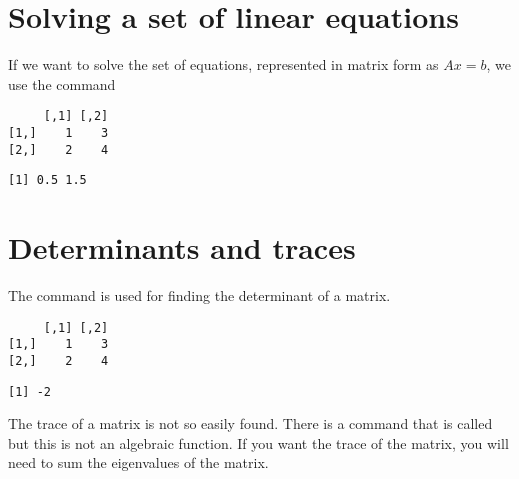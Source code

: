  
\section{Solving a set of linear equations} 
 
If we want to solve the set of equations, represented in matrix form as $Ax=b$, we use the  command 
\begin{knitrout}
\color{fgcolor}\begin{kframe}
\begin{alltt}
\hlstd{> }
\end{alltt}
\begin{verbatim}
     [,1] [,2]
[1,]    1    3
[2,]    2    4
\end{verbatim}
\begin{alltt}
\hlstd{> }\hlkwb{=}\hlstd{(}\hlstd{,}\hlstd{)}
\hlstd{> }
\end{alltt}
\begin{verbatim}
[1] 0.5 1.5
\end{verbatim}
\end{kframe}
\end{knitrout}
 
\section{Determinants and traces} 
 
The  command is used for finding the determinant of a matrix. 
\begin{knitrout}
\color{fgcolor}\begin{kframe}
\begin{alltt}
\hlstd{> }
\end{alltt}
\begin{verbatim}
     [,1] [,2]
[1,]    1    3
[2,]    2    4
\end{verbatim}
\begin{alltt}
\hlstd{> }
\end{alltt}
\begin{verbatim}
[1] -2
\end{verbatim}
\end{kframe}
\end{knitrout}
 
The trace of a matrix is not so easily found. There is a command that is called  but this is not an algebraic function. If you want the trace of the matrix, you will need to sum the eigenvalues of the matrix. 
 
